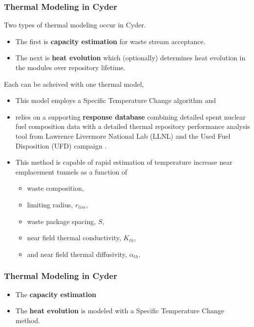 \begin{frame}[ctb!]
\frametitle{Thermal Modeling in Cyder}
Two types of thermal modeling occur in Cyder. 
\begin{itemize}
\item The first is \textbf{capacity estimation} for waste stream acceptance.
\item The next is \textbf{heat evolution} which (optionally) determines heat evolution in 
the modules over repository lifetime.
\end{itemize}
Each can be acheived with one thermal model,
\begin{itemize}
\item This model employs a Specific Temperature Change algorithm \cite{radel_effect_2007, radel_repository_2007} and
\item relies on a supporting \textbf{response database} combining detailed 
spent nuclear fuel composition data \cite{carter_fuel_2011} with a detailed 
thermal repository performance analysis tool from Lawrence Livermore National 
Lab (LLNL) and the Used Fuel Disposition (UFD) 
campaign \cite{greenberg_application_2012}.  
\item This method is capable of rapid estimation of temperature increase near emplacement tunnels as a function of 
\begin{itemize}
\item waste composition,
\item limiting radius, $r_{lim}$, 
\item waste package spacing, $S$, 
\item near field thermal conductivity, $K_{th}$, 
\item and near field thermal diffusivity, $\alpha_{th}$.
\end{itemize}
\end{itemize}
\end{frame}


\begin{frame}[ctb!]
\frametitle{Thermal Modeling in Cyder}
\begin{itemize}
\item The \textbf{capacity estimation} 
\item The \textbf{heat evolution} is modeled with a Specific Temperature Change method.
\end{itemize}

\end{frame}



